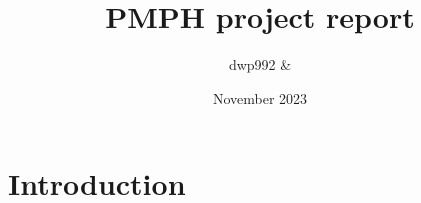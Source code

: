 \documentclass{article}
\title{PMPH project report}
\author{dwp992 \& }
\date{November 2023}
\begin{document}
\maketitle

\section{Introduction}
\end{document}
